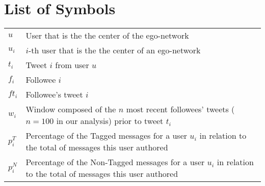 \documentclass[11pt,twoside,a4paper]{book}
\renewcommand{\chaptermark}[1]{\markboth{\MakeUppercase{#1}}{}}
\begin{document}
\chapter{List of Symbols}
\begin{table}[htbp]
	\begin{tabular}{>{\raggedright\arraybackslash}m{2cm}m{14cm}}
					$u$    & User that is the the center of the ego-network\\
					$u_i$    & $i$-th user that is the the center of an ego-network\\
					$t_i$    & Tweet $i$ from user $u$\\
					$f_i$    & Followee $i$\\
					$ft_i$    & Followee's tweet $i$\\
					$w_i$    & Window composed of the $n$ most recent followees' tweets ($n=100$ in our analysis) prior to tweet $t_i$\\
					$p_i^T$    & Percentage of the Tagged messages for a user $u_i$ in relation to the total of messages this user authored\\
					$p_i^N$    & Percentage of the Non-Tagged messages for a user $u_i$ in relation to the total of messages this user authored\\
	\end{tabular}
\end{table}

\listoffigures            
\listoftables            

\mainmatter

\fancyhead[RE,LO]{\thesection}

\singlespacing              %
\hypersetup{pageanchor=true}








\renewcommand{\chaptermark}[1]{\markboth{\MakeUppercase{\appendixname\ \thechapter}} {\MakeUppercase{#1}} }
\fancyhead[RE,LO]{}
\appendix

% 

\backmatter \singlespacing   %


%
\end{document}
